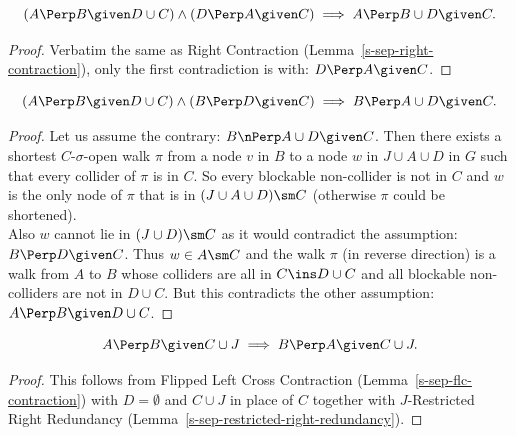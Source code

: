 \begin{Lem}
    \[ (A \Perp  B \given D \cup  C) \land (D \Perp  A \given C) \implies A  \Perp  B \cup  D \given C.\]
\begin{proof}
    Verbatim the same as Right Contraction (Lemma~\ref{s-sep-right-contraction}), 
    only the first contradiction is with: $D \Perp A \given C$.
\end{proof}
\end{Lem}

\begin{Lem}
    \label{s-sep-flc-contraction}
    \[ (A \Perp  B \given D \cup  C) \land (B \Perp  D \given C) \implies B \Perp  A \cup  D \given C.\]
\begin{proof}
    Let us assume the contrary:  $B  \nPerp  A \cup D \given C$.
    Then there exists a shortest $C$-$\sigma$-open walk $\pi$ 
    from a node $v$ in $B$ to a node $w$ in $J \cup A \cup D$ in $G$ such that every collider of $\pi$ is in $C$.
    So every blockable non-collider is not in $C$ and $w$ is 
    the only node of $\pi$ that is in $(J \cup A \cup D)\sm C$ (otherwise $\pi$ could be shortened). \\
    Also $w$ cannot lie in $(J \cup D) \sm C$ as it would contradict the assumption: $B \Perp  D \given C$.
    Thus $w \in A \sm C$ and the walk $\pi$ (in reverse direction) is a walk from $A$ to $B$ whose colliders are all in 
    $C \ins D \cup C$ 
    and all blockable non-colliders are not in $D \cup C$.
    But this contradicts the other assumption: $A \Perp  B \given D \cup  C$.
\end{proof}
\end{Lem}


\begin{Lem}
    \[A \Perp  B \given C \cup J \implies B \Perp A \given C \cup J.\]
\begin{proof}
  This follows from Flipped Left Cross Contraction (Lemma~\ref{s-sep-flc-contraction}) with $D=\emptyset$ and $C \cup J$ in place of $C$ together with
    $J$-Restricted Right Redundancy (Lemma~\ref{s-sep-restricted-right-redundancy}).
\end{proof}
\end{Lem}


